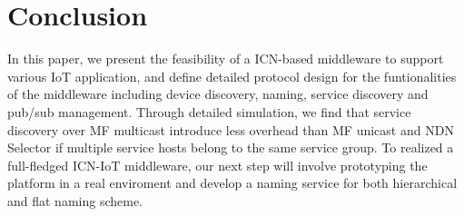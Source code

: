 \section{Conclusion}
In this paper, we present the feasibility of a ICN-based middleware to support various IoT application, and define detailed protocol design for the funtionalities of the middleware including device discovery, naming, service discovery and pub/sub management. Through detailed simulation, we find that service discovery over MF multicast introduce less overhead than MF unicast and NDN Selector if multiple service hosts belong to the same service group. To realized a full-fledged ICN-IoT middleware, our next step will involve prototyping the platform in a real enviroment and develop a naming service for both hierarchical and flat naming scheme.    